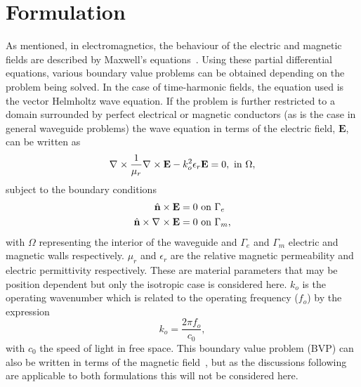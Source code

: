 \section{Formulation}
\label{lezar:sec:formulation}

As mentioned, in electromagnetics, the behaviour of the electric and
magnetic fields are described by Maxwell's equations~\cite{Jin2002,
Smi1997}.  Using these partial differential equations, various
boundary value problems can be obtained depending on the problem being
solved.  In the case of time-harmonic fields, the equation used is the
vector Helmholtz wave equation. If
the problem is further restricted to a domain surrounded by perfect
electrical or magnetic conductors (as is the case in general waveguide
problems) the wave equation in terms of the electric field, $\mathbf{E}$, can
be written as~\cite{Jin2002}
\begin{equation}
    \label{lezar:eqn:vector_helmholtz}
    \nabla_{} \times {\frac{1}{\mu_r}\nabla_{} \times {\mathbf{E}}} - k_o^2\epsilon_r\mathbf{E} = 0, \text{ in
    $\Omega$},
\end{equation}
subject to the boundary conditions
\begin{align}
    \label{lezar:eqn:electric_wall_BC}
    \hat{\mathbf{n}}\times\mathbf{E} &= 0 \text{ on $\Gamma_{e}$}\\
    \label{lezar:eqn:magnetic_wall_BC}
    \hat{\mathbf{n}}\times\nabla_{} \times {\mathbf{E}} &= 0 \text{ on $\Gamma_{m}$},
\end{align}
with $\Omega$ representing the interior of the waveguide and
$\Gamma_{e}$ and $\Gamma_{m}$ electric and magnetic walls
respectively. $\mu_r$ and $\epsilon_r$ are the relative magnetic permeability
and electric permittivity respectively.  These are material parameters
that may be position dependent but only the isotropic case is
considered here. $k_o$ is the operating
wavenumber which is related to the
operating frequency ($f_o$) by the expression
\begin{equation}
 k_o = \frac{2\pi f_o}{c_0},
\end{equation}
with $c_0$ the speed of light in free space.  This boundary value
problem (BVP) can also be written in terms of the magnetic
field~\cite{Jin2002}, but as the discussions following are applicable
to both formulations this will not be considered here.

